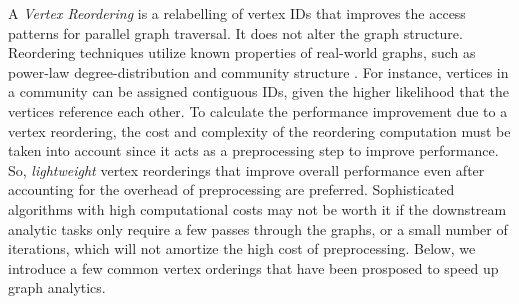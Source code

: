 


A \textit{Vertex Reordering} is a relabelling of vertex IDs that improves the access patterns for parallel graph traversal. It does not alter the graph structure. Reordering techniques utilize known properties of real-world graphs, such as power-law degree-distribution \cite{barabasi2009scale} and community structure  \cite{girvan2002community}. For instance, vertices in a community can be assigned contiguous IDs, given the higher likelihood that the vertices reference each other. To calculate the performance improvement due to a vertex reordering, the cost and complexity of the reordering computation must be taken into account since it acts as a preprocessing step to improve performance. So, \textit{lightweight} vertex reorderings that improve overall performance even after accounting for the overhead of preprocessing \cite{lwr} are preferred. Sophisticated algorithms with high computational costs may not be worth it if the downstream analytic tasks only require a few passes through the graphs, or a small number of iterations, which will not amortize the high cost of preprocessing. Below, we introduce a few common vertex orderings that have been prosposed to speed up graph analytics.


